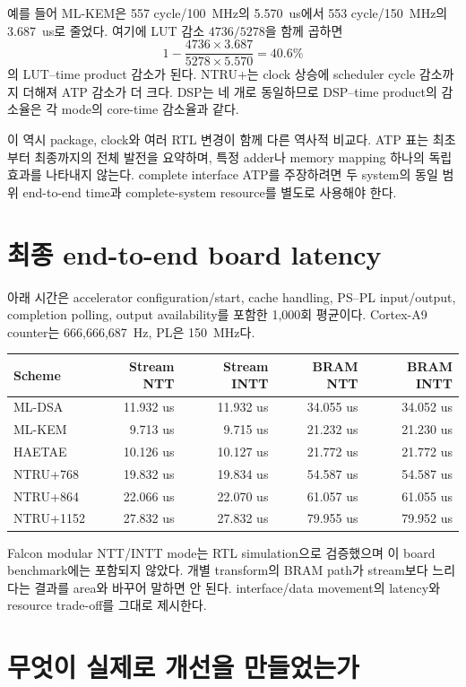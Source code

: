 예를 들어 ML-KEM은 557 cycle/100~MHz의 5.570~us에서
553 cycle/150~MHz의 3.687~us로 줄었다. 여기에 LUT 감소
$4736/5278$을 함께 곱하면
\[
1-\frac{4736\times3.687}{5278\times5.570}=40.6\%
\]
의 LUT--time product 감소가 된다. NTRU+는 clock 상승에 scheduler cycle
감소까지 더해져 ATP 감소가 더 크다. DSP는 네 개로 동일하므로 DSP--time
product의 감소율은 각 mode의 core-time 감소율과 같다.

이 역시 package, clock와 여러 RTL 변경이 함께 다른 역사적 비교다. ATP 표는
최초부터 최종까지의 전체 발전을 요약하며, 특정 adder나 memory mapping 하나의
독립 효과를 나타내지 않는다. complete interface ATP를 주장하려면 두 system의
동일 범위 end-to-end time과 complete-system resource를 별도로 사용해야 한다.

\section{최종 end-to-end board latency}

아래 시간은 accelerator configuration/start, cache handling, PS--PL input/output,
completion polling, output availability를 포함한 1,000회 평균이다. Cortex-A9
counter는 666,666,687~Hz, PL은 150~MHz다.

\begin{longtable}{L{30mm}r r r r}
\toprule
Scheme & Stream NTT & Stream INTT & BRAM NTT & BRAM INTT \\
\midrule
ML-DSA & 11.932 us & 11.932 us & 34.055 us & 34.052 us \\
ML-KEM & 9.713 us & 9.715 us & 21.232 us & 21.230 us \\
HAETAE & 10.126 us & 10.127 us & 21.772 us & 21.772 us \\
NTRU+768 & 19.832 us & 19.834 us & 54.587 us & 54.587 us \\
NTRU+864 & 22.066 us & 22.070 us & 61.057 us & 61.055 us \\
NTRU+1152 & 27.832 us & 27.832 us & 79.955 us & 79.952 us \\
\bottomrule
\end{longtable}

Falcon modular NTT/INTT mode는 RTL simulation으로 검증했으며 이 board benchmark에는
포함되지 않았다. 개별 transform의 BRAM path가 stream보다 느리다는 결과를 area와
바꾸어 말하면 안 된다. interface/data movement의 latency와 resource trade-off를
그대로 제시한다.

\section{무엇이 실제로 개선을 만들었는가}

